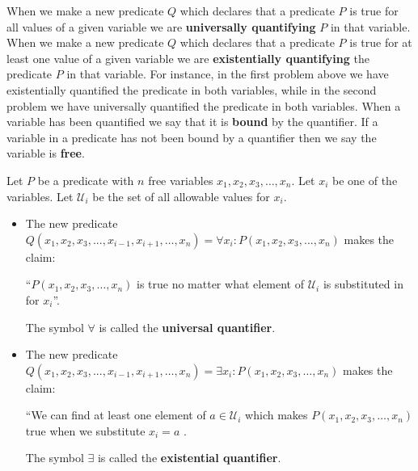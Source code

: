 When we make a new predicate $Q$ which declares that a predicate $P$ is true for all values of a given variable we are \textbf{universally quantifying} $P$ in that variable.   When we make a new predicate $Q$ which declares that a predicate $P$ is true for at least one value of a given variable we are \textbf{existentially quantifying} the predicate $P$ in that variable.  For instance, in the first problem above we have existentially quantified the predicate in both variables, while in the second problem we have universally quantified the predicate in both variables.  When a variable has been quantified we say that it is \textbf{bound} by the quantifier.  If a variable in a predicate has not been bound by a quantifier then we say the variable is \textbf{free}.

\begin{definition}
	Let $P$ be a predicate with $n$ free variables $x_1,x_2,x_3, \dots, x_n$.  
	Let $x_i$ be one of the variables. Let $\mathcal{U}_i$ be the set of all allowable values for $x_i$.
		\begin{itemize} 
			\item The new predicate $Q(x_1,x_2, x_3, ..., x_{i-1}, x_{i+1}, \dots , x_n) = \forall x_i  : P(x_1,x_2,x_3, \dots, x_n)$ makes the claim:
			
			``$P(x_1,x_2,x_3, \dots, x_n)$ is true no matter what element of $\mathcal{U}_i$ is substituted in for $x_i$''.
			
			The symbol $\forall$ is called the \textbf{universal quantifier}.
			
			\item The new predicate $Q(x_1,x_2, x_3, ..., x_{i-1}, x_{i+1}, \dots , x_n) = \exists x_i  : P(x_1,x_2,x_3, \dots, x_n)$ makes the claim:

``We can find at least one element of $a \in \mathcal{U}_i$ which makes $P(x_1,x_2,x_3, \dots, x_n)$ true when we substitute $x_i = a$ .

The symbol $\exists$ is called the \textbf{existential quantifier}.
		\end{itemize}  
	
	\end{definition}

